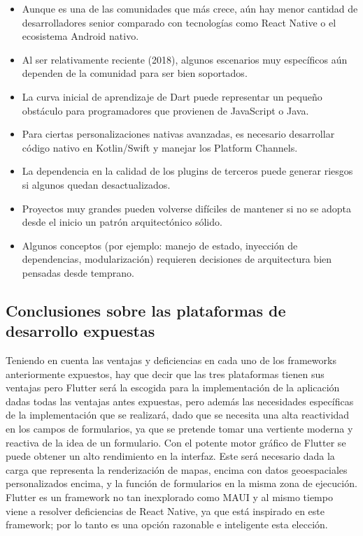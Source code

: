 \begin{itemize}
    \item Aunque es una de las comunidades que más crece, aún hay menor cantidad de desarrolladores senior comparado con tecnologías como React Native o el ecosistema Android nativo.
    \item Al ser relativamente reciente (2018), algunos escenarios muy específicos aún dependen de la comunidad para ser bien soportados.
    \item La curva inicial de aprendizaje de Dart puede representar un pequeño obstáculo para programadores que provienen de JavaScript o Java.
    \item Para ciertas personalizaciones nativas avanzadas, es necesario desarrollar código nativo en Kotlin/Swift y manejar los Platform Channels.
    \item La dependencia en la calidad de los plugins de terceros puede generar riesgos si algunos quedan desactualizados.
    \item Proyectos muy grandes pueden volverse difíciles de mantener si no se adopta desde el inicio un patrón arquitectónico sólido.
    \item Algunos conceptos (por ejemplo: manejo de estado, inyección de dependencias, modularización) requieren decisiones de arquitectura bien pensadas desde temprano.
\end{itemize}

\subsection{Conclusiones sobre las plataformas de desarrollo expuestas}
Teniendo en cuenta las ventajas y deficiencias en cada uno de los frameworks anteriormente expuestos, hay que decir que las tres plataformas tienen sus ventajas pero Flutter será la escogida
para la implementación de la aplicación dadas todas las ventajas antes expuestas, pero además las necesidades específicas de la implementación que se realizará, dado que se necesita una alta reactividad
en los campos de formularios, ya que se pretende tomar una vertiente moderna y reactiva de la idea de un formulario. Con el potente motor gráfico de Flutter se puede obtener un alto rendimiento en la interfaz.
Este será necesario dada la carga que representa la renderización de mapas, encima con datos geoespaciales personalizados encima, y la función de formularios en la misma zona de ejecución. Flutter es un
framework no tan inexplorado como MAUI y al mismo tiempo viene a resolver deficiencias de React Native, ya que está inspirado en este framework; por lo tanto es una opción razonable e inteligente esta elección.
